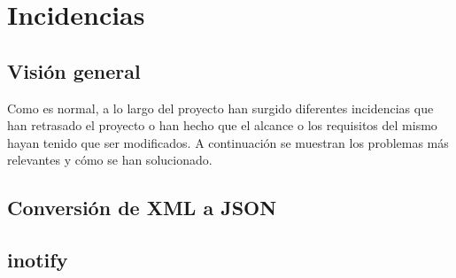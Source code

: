 \chapter{Incidencias}

\section{Visión general}

	Como es normal, a lo largo del proyecto han surgido diferentes incidencias que han retrasado el proyecto o han hecho que el alcance o los requisitos del mismo hayan tenido que ser modificados. A continuación se muestran los problemas más relevantes y cómo se han solucionado.

\section{Conversión de XML a JSON}



\section{inotify}